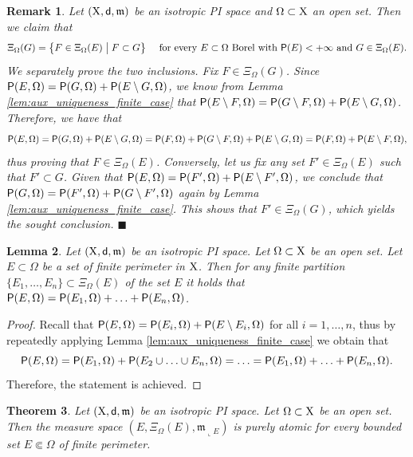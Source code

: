 \documentclass[reqno]{amsart}
\numberwithin{equation}{section}
\newcommand{\X}{{\rm X}}
\newcommand{\sfd}{{\sf d}}
\newcommand{\mm}{\mathfrak m}
\newcommand{\1}{\mathbbm 1}
\renewcommand{\P}{{\sf P}}
\newcommand{\fr}{\penalty-20\null\hfill\(\blacksquare\)}
\newtheorem{theorem}{Theorem}[section]
\newtheorem{lemma}[theorem]{Lemma}
\newtheorem{remark}[theorem]{Remark}
\begin{document}
%
%
\begin{remark}\label{rmk:localise_Xi}{\rm
Let \((\X,\sfd,\mm)\) be an isotropic PI space and \(\Omega\subset\X\) an
open set. Then we claim that
\[
\Xi_\Omega(G)=\big\{F\in\Xi_\Omega(E)\;\big|\;F\subset G\big\}
\quad\text{ for every }E\subset\Omega\text{ Borel with }\P(E)<+\infty
\text{ and }G\in\Xi_\Omega(E).
\]
We separately prove the two inclusions. Fix \(F\in\Xi_\Omega(G)\).
Since \(\P(E,\Omega)=\P(G,\Omega)+\P(E\setminus G,\Omega)\), we know
from Lemma \ref{lem:aux_uniqueness_finite_case} that
\(\P(E\setminus F,\Omega)=\P(G\setminus F,\Omega)+\P(E\setminus G,\Omega)\).
Therefore, we have that
\[
\P(E,\Omega)=\P(G,\Omega)+\P(E\setminus G,\Omega)
=\P(F,\Omega)+\P(G\setminus F,\Omega)+\P(E\setminus G,\Omega)
=\P(F,\Omega)+\P(E\setminus F,\Omega),
\]
thus proving that \(F\in\Xi_\Omega(E)\). Conversely, let us fix any set
\(F'\in\Xi_\Omega(E)\) such that \(F'\subset G\). Given that
\(\P(E,\Omega)=\P(F',\Omega)+\P(E\setminus F',\Omega)\), we conclude that
\(\P(G,\Omega)=\P(F',\Omega)+\P(G\setminus F',\Omega)\) again by
Lemma \ref{lem:aux_uniqueness_finite_case}. This shows that \(F'\in\Xi_\Omega(G)\),
which yields the sought conclusion.
\fr}\end{remark}
%
%
\begin{lemma}\label{lem:partition_Lyapunov}
Let \((\X,\sfd,\mm)\) be an isotropic PI space. Let \(\Omega\subset\X\) be an
open set. Let \(E\subset\Omega\) be a set of finite
perimeter in \(\X\). Then for any finite partition
\(\{E_1,\ldots,E_n\}\subset\Xi_\Omega(E)\) of the set \(E\)
it holds that \(\P(E,\Omega)=\P(E_1,\Omega)+\ldots+\P(E_n,\Omega)\).
\end{lemma}
\begin{proof}
Recall that \(\P(E,\Omega)=\P(E_i,\Omega)+\P(E\setminus E_i,\Omega)\) for all
\(i=1,\ldots,n\), thus by repeatedly applying Lemma \ref{lem:aux_uniqueness_finite_case}
we obtain that
\[
\P(E,\Omega)=\P(E_1,\Omega)+\P(E_2\cup\ldots\cup E_n,\Omega)
=\ldots=\P(E_1,\Omega)+\ldots+\P(E_n,\Omega).
\]
Therefore, the statement is achieved.
\end{proof}
%
%
\begin{theorem}\label{thm:altern_decomp_aux}
Let \((\X,\sfd,\mm)\) be an isotropic PI space.
Let \(\Omega\subset\X\) be an open set.
Then the measure space \((E,\Xi_\Omega(E),\mm_{\llcorner E})\) is purely atomic
for every bounded set \(E\Subset\Omega\) of finite perimeter.
\end{theorem}
\end{document}
